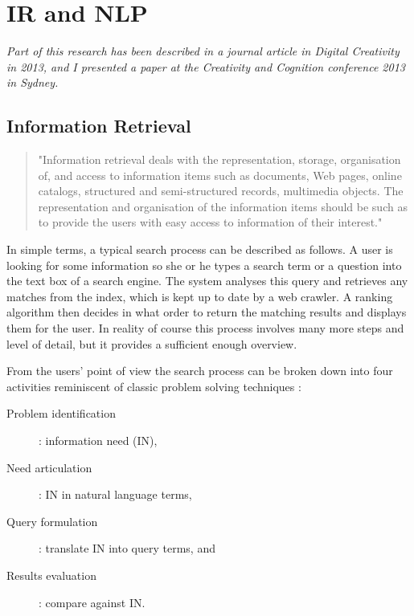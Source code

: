 
\chapter{IR and NLP}
\label{ch:irnlp}

\emph{Part of this research has been described in a journal article in Digital Creativity in 2013, and I presented a paper at the Creativity and Cognition conference 2013 in Sydney.}

\grule

\section{Information Retrieval}

\begin{quote}
  "Information retrieval deals with the representation, storage, organisation of, and access to information items such as documents, Web pages, online catalogs, structured and semi-structured records, multimedia objects. The representation and organisation of the information items should be such as to provide the users with easy access to information of their interest." \citep{Baeza-Yates2011}
\end{quote}

In simple terms, a typical search process can be described as follows. A user is looking for some information so she or he types a search term or a question into the text box of a search engine. The system analyses this query and retrieves any matches from the index, which is kept up to date by a web crawler. A ranking algorithm then decides in what order to return the matching results and displays them for the user. In reality of course this process involves many more steps and level of detail, but it provides a sufficient enough overview.

From the users' point of view the search process can be broken down into four activities \citep{Sutcliffe1998} reminiscent of classic problem solving techniques \citep{Polya1957}:

\begin{description}
  \item [Problem identification]: information need (IN),
  \item [Need articulation]: IN in natural language terms,
  \item [Query formulation]: translate IN into query terms, and
  \item [Results evaluation]: compare against IN.
\end{description}

